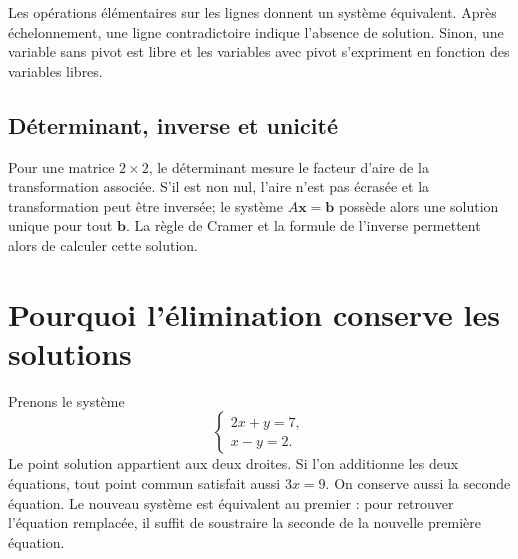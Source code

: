 \begin{connectionbox}
Les opérations élémentaires sur les lignes donnent un système équivalent. Après échelonnement, une ligne contradictoire indique l'absence de solution. Sinon, une variable sans pivot est libre et les variables avec pivot s'expriment en fonction des variables libres.
\end{connectionbox}

\begin{center}
\end{center}

\subsection{Déterminant, inverse et unicité}
Pour une matrice $2\times2$, le déterminant mesure le facteur d'aire de la transformation associée. S'il est non nul, l'aire n'est pas écrasée et la transformation peut être inversée; le système $A\mathbf x=\mathbf b$ possède alors une solution unique pour tout $\mathbf b$. La règle de Cramer et la formule de l'inverse permettent alors de calculer cette solution.


\section{Pourquoi l'élimination conserve les solutions}
\label{manual:section:12.08}

Prenons le système
\[
\begin{cases}
2x+y=7,\\
x-y=2.
\end{cases}
\]
Le point solution appartient aux deux droites. Si l'on additionne les deux équations, tout point commun satisfait aussi $3x=9$. On conserve aussi la seconde équation. Le nouveau système est équivalent au premier : pour retrouver l'équation remplacée, il suffit de soustraire la seconde de la nouvelle première équation.

